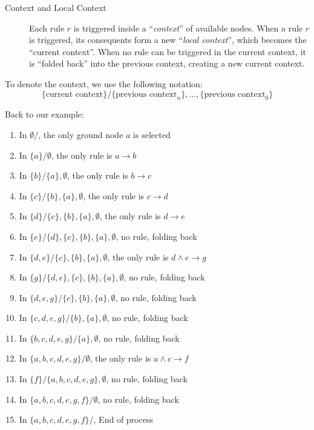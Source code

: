 \documentclass[a4paper]{article}
\newcommand*{\say}[1]{``{#1}''}
\newcommand*{\rar}{\rightarrow}                         %
\newcommand*{\conj}{\wedge}                             %
\begin{document}
\medskip
\begin{description}
  \item[Context and Local Context]
    Each rule $r$ is triggered inside a \say{\emph{context}} of available nodes.
    When a rule $r$ is triggered, its consequents form a new \say{\emph{local context}},
    which becomes the \say{current context}.
    When no rule can be triggered in the current context, it is \say{folded back} into the previous context,
    creating a new current context.
\end{description}

To denote the context, we use the following notation:
\[
  \{\text{current context}\}/\{\text{previous context}_n\},\dots,\{\text{previous context}_0\}
\]

Back to our example:
\begin{enumerate}
  \item In $\emptyset{}/$, the only ground node $a$ is selected
  \item In $\{a\}/\emptyset$, the only rule is $a\rar b$
  \item In $\{b\}/\{a\},\emptyset$, the only rule is $b\rar c$
  \item In $\{c\}/\{b\},\{a\},\emptyset$, the only rule is $c\rar d$
  \item In $\{d\}/\{c\},\{b\},\{a\},\emptyset$, the only rule is $d\rar e$
  \item In $\{e\}/\{d\},\{c\},\{b\},\{a\},\emptyset$, no rule, folding back
  \item In $\{d, e\}/\{c\},\{b\},\{a\},\emptyset$, the only rule is $d\conj e \rar g$
  \item In $\{g\}/\{d, e\},\{c\},\{b\},\{a\},\emptyset$, no rule, folding back
  \item In $\{d, e, g\}/\{c\},\{b\},\{a\},\emptyset$, no rule, folding back
  \item In $\{c, d, e, g\}/\{b\},\{a\},\emptyset$, no rule, folding back
  \item In $\{b, c, d, e, g\}/\{a\},\emptyset$, no rule, folding back
  \item In $\{a, b, c, d, e, g\}/\emptyset$, the only rule is $a\conj c \rar f$
  \item In $\{f\}/\{a, b, c, d, e, g\},\emptyset$, no rule, folding back
  \item In $\{a, b, c, d, e, g, f\}/\emptyset$, no rule, folding back
  \item In $\{a, b, c, d, e, g, f\}/$, End of process
\end{enumerate}
\end{document}
